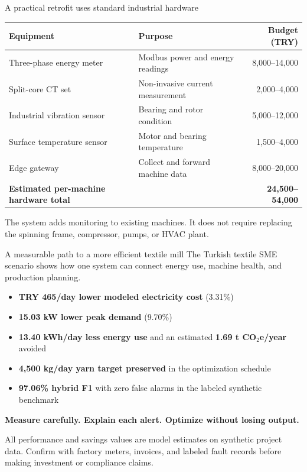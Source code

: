 \documentclass[aspectratio=169,10pt]{beamer}
\begin{document}
\begin{frame}{A practical retrofit uses standard industrial hardware}
\large
\begin{tabularx}{\linewidth}{@{}>{\raggedright\arraybackslash}X>{\raggedright\arraybackslash}Xr@{}}
\toprule
\textbf{Equipment} & \textbf{Purpose} & \textbf{Budget (TRY)}\\
\midrule
Three-phase energy meter & Modbus power and energy readings & 8,000--14,000\\
Split-core CT set & Non-invasive current measurement & 2,000--4,000\\
Industrial vibration sensor & Bearing and rotor condition & 5,000--12,000\\
Surface temperature sensor & Motor and bearing temperature & 1,500--4,000\\
Edge gateway & Collect and forward machine data & 8,000--20,000\\
\midrule
\textbf{Estimated per-machine hardware total} & & \textbf{24,500--54,000}\\
\bottomrule
\end{tabularx}
\large
The system adds monitoring to existing machines. It does not require replacing the spinning frame, compressor, pumps, or HVAC plant.\par
\end{frame}

\begin{frame}{A measurable path to a more efficient textile mill}
\large
The Turkish textile SME scenario shows how one system can connect energy use, machine health, and production planning.
\vspace{5mm}
\begin{itemize}\setlength\itemsep{7pt}
  \item \textbf{TRY 465/day lower modeled electricity cost} (3.31\%)
  \item \textbf{15.03 kW lower peak demand} (9.70\%)
  \item \textbf{13.40 kWh/day less energy use} and an estimated \textbf{1.69 t CO$_2$e/year} avoided
  \item \textbf{4,500 kg/day yarn target preserved} in the optimization schedule
  \item \textbf{97.06\% hybrid F1} with zero false alarms in the labeled synthetic benchmark
\end{itemize}
\vfill
\begin{center}\color{Teal}\bfseries\Large Measure carefully. Explain each alert. Optimize without losing output.\end{center}
\vspace{2mm}
\centering\scriptsize\color{Muted}All performance and savings values are model estimates on synthetic project data. Confirm with factory meters, invoices, and labeled fault records before making investment or compliance claims.
\end{frame}
\end{document}
